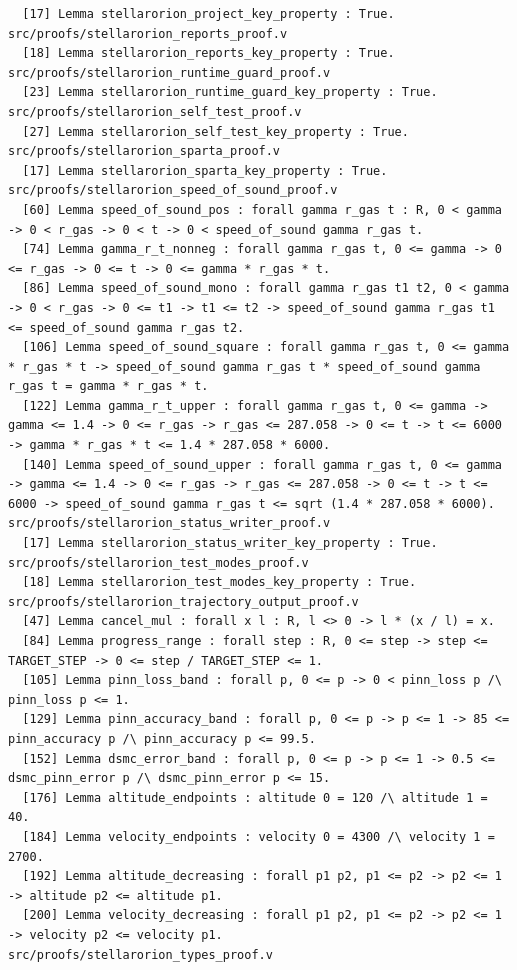 \documentclass[11pt]{article}
\theoremstyle{definition}
\begin{document}
\begin{verbatim}
  [17] Lemma stellarorion_project_key_property : True.
src/proofs/stellarorion_reports_proof.v
  [18] Lemma stellarorion_reports_key_property : True.
src/proofs/stellarorion_runtime_guard_proof.v
  [23] Lemma stellarorion_runtime_guard_key_property : True.
src/proofs/stellarorion_self_test_proof.v
  [27] Lemma stellarorion_self_test_key_property : True.
src/proofs/stellarorion_sparta_proof.v
  [17] Lemma stellarorion_sparta_key_property : True.
src/proofs/stellarorion_speed_of_sound_proof.v
  [60] Lemma speed_of_sound_pos : forall gamma r_gas t : R, 0 < gamma -> 0 < r_gas -> 0 < t -> 0 < speed_of_sound gamma r_gas t.
  [74] Lemma gamma_r_t_nonneg : forall gamma r_gas t, 0 <= gamma -> 0 <= r_gas -> 0 <= t -> 0 <= gamma * r_gas * t.
  [86] Lemma speed_of_sound_mono : forall gamma r_gas t1 t2, 0 < gamma -> 0 < r_gas -> 0 <= t1 -> t1 <= t2 -> speed_of_sound gamma r_gas t1 <= speed_of_sound gamma r_gas t2.
  [106] Lemma speed_of_sound_square : forall gamma r_gas t, 0 <= gamma * r_gas * t -> speed_of_sound gamma r_gas t * speed_of_sound gamma r_gas t = gamma * r_gas * t.
  [122] Lemma gamma_r_t_upper : forall gamma r_gas t, 0 <= gamma -> gamma <= 1.4 -> 0 <= r_gas -> r_gas <= 287.058 -> 0 <= t -> t <= 6000 -> gamma * r_gas * t <= 1.4 * 287.058 * 6000.
  [140] Lemma speed_of_sound_upper : forall gamma r_gas t, 0 <= gamma -> gamma <= 1.4 -> 0 <= r_gas -> r_gas <= 287.058 -> 0 <= t -> t <= 6000 -> speed_of_sound gamma r_gas t <= sqrt (1.4 * 287.058 * 6000).
src/proofs/stellarorion_status_writer_proof.v
  [17] Lemma stellarorion_status_writer_key_property : True.
src/proofs/stellarorion_test_modes_proof.v
  [18] Lemma stellarorion_test_modes_key_property : True.
src/proofs/stellarorion_trajectory_output_proof.v
  [47] Lemma cancel_mul : forall x l : R, l <> 0 -> l * (x / l) = x.
  [84] Lemma progress_range : forall step : R, 0 <= step -> step <= TARGET_STEP -> 0 <= step / TARGET_STEP <= 1.
  [105] Lemma pinn_loss_band : forall p, 0 <= p -> 0 < pinn_loss p /\ pinn_loss p <= 1.
  [129] Lemma pinn_accuracy_band : forall p, 0 <= p -> p <= 1 -> 85 <= pinn_accuracy p /\ pinn_accuracy p <= 99.5.
  [152] Lemma dsmc_error_band : forall p, 0 <= p -> p <= 1 -> 0.5 <= dsmc_pinn_error p /\ dsmc_pinn_error p <= 15.
  [176] Lemma altitude_endpoints : altitude 0 = 120 /\ altitude 1 = 40.
  [184] Lemma velocity_endpoints : velocity 0 = 4300 /\ velocity 1 = 2700.
  [192] Lemma altitude_decreasing : forall p1 p2, p1 <= p2 -> p2 <= 1 -> altitude p2 <= altitude p1.
  [200] Lemma velocity_decreasing : forall p1 p2, p1 <= p2 -> p2 <= 1 -> velocity p2 <= velocity p1.
src/proofs/stellarorion_types_proof.v

\end{verbatim}
\end{document}
